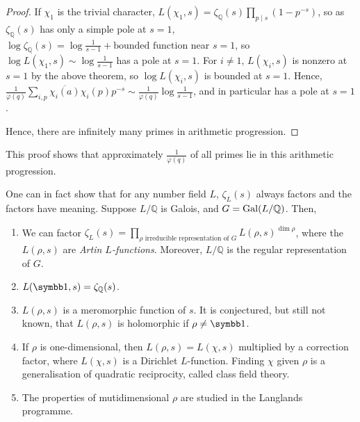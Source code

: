 \begin{proof}
    If \( \chi_1 \) is the trivial character, \( L(\chi_1, s) = \zeta_{\mathbb Q}(s) \prod_{p \mid s} (1 - p^{-s}) \), so as \( \zeta_{\mathbb Q}(s) \) has only a simple pole at \( s = 1 \), \( \log \zeta_{\mathbb Q}(s) = \log\frac{1}{s-1} + \text{bounded function} \) near \( s = 1 \), so \( \log L(\chi_1, s) \sim \log \frac{1}{s-1} \) has a pole at \( s = 1 \).
    For \( i \neq 1 \), \( L(\chi_i, s) \) is nonzero at \( s = 1 \) by the above theorem, so \( \log L(\chi_i, s) \) is bounded at \( s = 1 \).
    Hence, \( \frac{1}{\varphi(q)}\sum_{i,p}\overline{\chi_i(a)} \chi_i(p) p^{-s} \sim \frac{1}{\varphi(q)} \log \frac{1}{s-1} \), and in particular has a pole at \( s = 1 \).

    Hence, there are infinitely many primes in arithmetic progression.
\end{proof}
This proof shows that approximately \( \frac{1}{\varphi(q)} \) of all primes lie in this arithmetic progression.

One can in fact show that for any number field \( L \), \( \zeta_L(s) \) always factors and the factors have meaning.
Suppose \( L/\mathbb Q \) is Galois, and \( G = \operatorname{Gal}(L/\mathbb Q) \).
Then,
\begin{enumerate}
    \item We can factor \( \zeta_L(s) = \prod_{\rho \text{ irreducible representation of } G} L(\rho, s)^{\dim \rho} \), where the \( L(\rho, s) \) are \emph{Artin \( L \)-functions}.
    Moreover, \( L / \mathbb Q \) is the regular representation of \( G \).
    \item \( L(\symbb 1, s) = \zeta_{\mathbb Q}(s) \).
    \item \( L(\rho, s) \) is a meromorphic function of \( s \).
    It is conjectured, but still not known, that \( L(\rho, s) \) is holomorphic if \( \rho \neq \symbb 1 \).
    \item If \( \rho \) is one-dimensional, then \( L(\rho, s) = L(\chi, s) \) multiplied by a correction factor, where \( L(\chi, s) \) is a Dirichlet \( L \)-function.
    Finding \( \chi \) given \( \rho \) is a generalisation of quadratic reciprocity, called class field theory.
    \item The properties of mutidimensional \( \rho \) are studied in the Langlands programme.
\end{enumerate}
